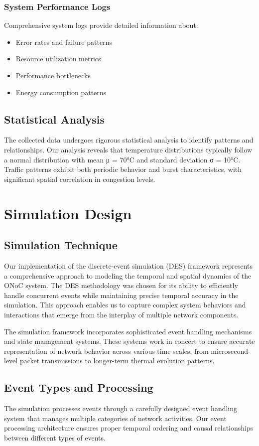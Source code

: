 \documentclass[12pt]{article}
\begin{document}
\subsubsection{System Performance Logs}
Comprehensive system logs provide detailed information about:
\begin{itemize}[noitemsep]
    \item Error rates and failure patterns
    \item Resource utilization metrics
    \item Performance bottlenecks
    \item Energy consumption patterns
\end{itemize}

\subsection{Statistical Analysis}
The collected data undergoes rigorous statistical analysis to identify patterns and relationships. Our analysis reveals that temperature distributions typically follow a normal distribution with mean μ = 70°C and standard deviation σ = 10°C. Traffic patterns exhibit both periodic behavior and burst characteristics, with significant spatial correlation in congestion levels.

\section{Simulation Design}
\subsection{Simulation Technique}
Our implementation of the discrete-event simulation (DES) framework represents a comprehensive approach to modeling the temporal and spatial dynamics of the ONoC system. The DES methodology was chosen for its ability to efficiently handle concurrent events while maintaining precise temporal accuracy in the simulation. This approach enables us to capture complex system behaviors and interactions that emerge from the interplay of multiple network components.

The simulation framework incorporates sophisticated event handling mechanisms and state management systems. These systems work in concert to ensure accurate representation of network behavior across various time scales, from microsecond-level packet transmissions to longer-term thermal evolution patterns.

\subsection{Event Types and Processing}
The simulation processes events through a carefully designed event handling system that manages multiple categories of network activities. Our event processing architecture ensures proper temporal ordering and causal relationships between different types of events.
\end{document}
